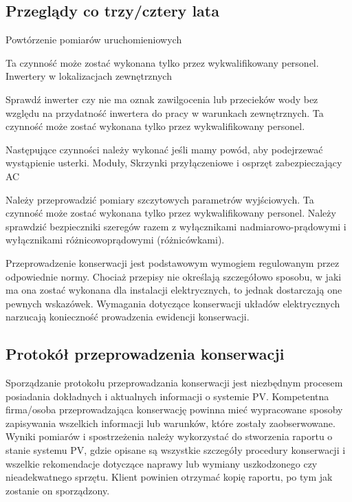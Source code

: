\documentclass[12pt,a4paper]{article}
\begin{document}
\subsection{Przeglądy co trzy/cztery lata}
  

Powtórzenie pomiarów uruchomieniowych 

Ta czynność może zostać wykonana tylko przez wykwalifikowany personel. 
Inwertery w lokalizacjach zewnętrznych 

Sprawdź inwerter czy nie ma oznak zawilgocenia lub przecieków wody bez 
względu na przydatność inwertera do pracy w warunkach zewnętrznych. Ta 
czynność może zostać wykonana tylko przez wykwalifikowany personel. 

Następujące czynności należy wykonać jeśli mamy powód, aby podejrzewać 
wystąpienie usterki. Moduły, Skrzynki przyłączeniowe i osprzęt 
zabezpieczający AC 

Należy przeprowadzić pomiary szczytowych parametrów wyjściowych. Ta 
czynność może zostać wykonana tylko przez wykwalifikowany personel. 
Należy sprawdzić bezpieczniki szeregów razem z wyłącznikami 
nadmiarowo-prądowymi i wyłącznikami różnicowoprądowymi (różnicówkami). 

 

Przeprowadzenie konserwacji jest podstawowym wymogiem regulowanym przez 
odpowiednie normy. Chociaż przepisy nie określają szczegółowo sposobu, w 
jaki ma ona zostać wykonana dla instalacji elektrycznych, to jednak 
dostarczają one pewnych wskazówek. Wymagania dotyczące konserwacji 
układów elektrycznych narzucają konieczność prowadzenia ewidencji 
konserwacji. 

\subsection{Protokół przeprowadzenia konserwacji}
  

Sporządzanie protokołu przeprowadzania konserwacji jest niezbędnym 
procesem posiadania dokładnych i aktualnych informacji o systemie PV. 
Kompetentna firma/osoba przeprowadzająca konserwację powinna mieć 
wypracowane sposoby zapisywania wszelkich informacji lub warunków, które 
zostały zaobserwowane. Wyniki pomiarów i spostrzeżenia należy 
wykorzystać do stworzenia raportu o stanie systemu PV, gdzie opisane są 
wszystkie szczegóły procedury konserwacji i wszelkie rekomendacje 
dotyczące naprawy lub wymiany uszkodzonego czy nieadekwatnego sprzętu. 
Klient powinien otrzymać kopię raportu, po tym jak zostanie on 
sporządzony. 
\end{document}
